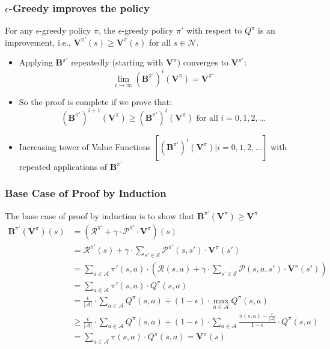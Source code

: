 \documentclass[handout]{beamer}
\newcommand{\bvpi}{\bm{V}^{\pi}}
\begin{document}
\begin{frame}
\frametitle{$\epsilon$-Greedy improves the policy}
\pause
\begin{theorem}
For any $\epsilon$-greedy policy $\pi$, the $\epsilon$-greedy policy $\pi'$ with respect to $Q^{\pi}$ is an improvement, i.e., $\bm{V}^{\pi'}(s) \geq \bm{V}^{\pi}(s)$ for all $s \in \mathcal{N}$.
\end{theorem}
\pause
\begin{itemize}[<+->]
\item Applying $\bm{B}^{\pi'}$ repeatedly (starting with $\bvpi$) converges to $\bm{V}^{\pi'}$:
$$\lim_{i\rightarrow \infty} (\bm{B}^{\pi'})^i(\bvpi) = \bm{V}^{\pi'}$$
\item So the proof is complete if we prove that:
$$(\bm{B}^{\pi'})^{i+1}(\bvpi) \geq (\bm{B}^{\pi'})^i(\bvpi) \text{ for all } i = 0, 1, 2, \ldots$$
\item Increasing tower of Value Functions $[(\bm{B}^{\pi'})^i(\bvpi)|i = 0, 1, 2, \ldots]$ with repeated applications of $\bm{B}^{\pi'}$
\end{itemize}
\end{frame}

\begin{frame}
\frametitle{Base Case of Proof by Induction}
\pause
The base case of proof by induction is to show that $\bm{B}^{\pi'}(\bvpi)  \geq  \bm{V}^{\pi}$
\pause
\begin{align*}
\bm{B}^{\pi'}(\bvpi)(s) & = (\bm{\mathcal{R}}^{\pi'} + \gamma \cdot \bm{\mathcal{P}}^{\pi'} \cdot \bvpi)(s) \\
& = \bm{\mathcal{R}}^{\pi'}(s) + \gamma \cdot \sum_{s' \in \mathcal{S}} \bm{\mathcal{P}}^{\pi'}(s,s') \cdot \bvpi(s') \\
& = \sum_{a \in \mathcal{A}} \pi'(s, a) \cdot (\mathcal{R}(s,a) + \gamma \cdot \sum_{s' \in \mathcal{S}} \mathcal{P}(s,a,s') \cdot \bvpi(s')) \\
& = \sum_{a \in \mathcal{A}} \pi'(s, a) \cdot Q^{\pi}(s,a) \\
& = \frac {\epsilon} {|\mathcal{A}|} \cdot \sum_{a \in \mathcal{A}} Q^{\pi}(s,a) + (1 - \epsilon) \cdot \max_{a \in \mathcal{A}} Q^{\pi}(s,a) \\
& \geq \frac {\epsilon} {|\mathcal{A}|} \cdot \sum_{a \in \mathcal{A}} Q^{\pi}(s,a) + (1 - \epsilon) \cdot \sum_{a \in \mathcal{A}} \frac {\pi(s,a) - \frac {\epsilon} {|\mathcal{A}|}} {1 - \epsilon} \cdot Q^{\pi}(s,a) \\
& = \sum_{a \in \mathcal{A}} \pi(s,a) \cdot Q^{\pi}(s,a) = \bm{V}^{\pi}(s)
\end{align*}
\end{frame}
\end{document}
